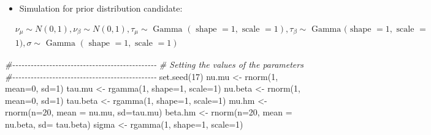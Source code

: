 \documentclass[
]{article}
\newenvironment{Shaded}{\begin{snugshade}}{\end{snugshade}}
\newcommand{\AttributeTok}[1]{\textcolor[rgb]{0.77,0.63,0.00}{#1}}
\newcommand{\CommentTok}[1]{\textcolor[rgb]{0.56,0.35,0.01}{\textit{#1}}}
\newcommand{\DecValTok}[1]{\textcolor[rgb]{0.00,0.00,0.81}{#1}}
\newcommand{\FunctionTok}[1]{\textcolor[rgb]{0.00,0.00,0.00}{#1}}
\newcommand{\NormalTok}[1]{#1}
\newcommand{\OtherTok}[1]{\textcolor[rgb]{0.56,0.35,0.01}{#1}}
\providecommand{\tightlist}{%
  \setlength{\itemsep}{0pt}\setlength{\parskip}{0pt}}
\begin{document}
\begin{itemize}
\tightlist
\item
  Simulation for prior distribution candidate:
\end{itemize}

\[
\begin{aligned}
& \nu_\mu \sim N(0,1), \nu_\beta \sim N(0,1), \tau_\mu \sim \text { Gamma }(\text { shape }=1, \text { scale }=1), \tau_\beta \sim \text { Gamma }(\text { shape }=1, \text { scale }= \\
& 1), \sigma \sim \text { Gamma }(\text { shape }=1, \text { scale }=1)
\end{aligned}
\]

\begin{Shaded}
\begin{Highlighting}[]
\CommentTok{\#{-}{-}{-}{-}{-}{-}{-}{-}{-}{-}{-}{-}{-}{-}{-}{-}{-}{-}{-}{-}{-}{-}{-}{-}{-}{-}{-}{-}{-}{-}{-}{-}{-}{-}{-}{-}{-}{-}{-}{-}{-}{-}{-}{-}{-}{-}{-}}
\CommentTok{\# Setting the values of the parameters}
\CommentTok{\#{-}{-}{-}{-}{-}{-}{-}{-}{-}{-}{-}{-}{-}{-}{-}{-}{-}{-}{-}{-}{-}{-}{-}{-}{-}{-}{-}{-}{-}{-}{-}{-}{-}{-}{-}{-}{-}{-}{-}{-}{-}{-}{-}{-}{-}{-}{-}}
\FunctionTok{set.seed}\NormalTok{(}\DecValTok{17}\NormalTok{)}
\NormalTok{nu.mu }\OtherTok{\textless{}{-}} \FunctionTok{rnorm}\NormalTok{(}\DecValTok{1}\NormalTok{, }\AttributeTok{mean=}\DecValTok{0}\NormalTok{, }\AttributeTok{sd=}\DecValTok{1}\NormalTok{)}
\NormalTok{tau.mu }\OtherTok{\textless{}{-}} \FunctionTok{rgamma}\NormalTok{(}\DecValTok{1}\NormalTok{, }\AttributeTok{shape=}\DecValTok{1}\NormalTok{, }\AttributeTok{scale=}\DecValTok{1}\NormalTok{)}
\NormalTok{nu.beta }\OtherTok{\textless{}{-}} \FunctionTok{rnorm}\NormalTok{(}\DecValTok{1}\NormalTok{, }\AttributeTok{mean=}\DecValTok{0}\NormalTok{, }\AttributeTok{sd=}\DecValTok{1}\NormalTok{)}
\NormalTok{tau.beta }\OtherTok{\textless{}{-}} \FunctionTok{rgamma}\NormalTok{(}\DecValTok{1}\NormalTok{, }\AttributeTok{shape=}\DecValTok{1}\NormalTok{, }\AttributeTok{scale=}\DecValTok{1}\NormalTok{)}
\NormalTok{mu.hm }\OtherTok{\textless{}{-}} \FunctionTok{rnorm}\NormalTok{(}\AttributeTok{n=}\DecValTok{20}\NormalTok{, }\AttributeTok{mean =}\NormalTok{ nu.mu, }\AttributeTok{sd=}\NormalTok{tau.mu)}
\NormalTok{beta.hm }\OtherTok{\textless{}{-}} \FunctionTok{rnorm}\NormalTok{(}\AttributeTok{n=}\DecValTok{20}\NormalTok{, }\AttributeTok{mean =}\NormalTok{ nu.beta, }\AttributeTok{sd=}\NormalTok{ tau.beta)}
\NormalTok{sigma }\OtherTok{\textless{}{-}} \FunctionTok{rgamma}\NormalTok{(}\DecValTok{1}\NormalTok{, }\AttributeTok{shape=}\DecValTok{1}\NormalTok{, }\AttributeTok{scale=}\DecValTok{1}\NormalTok{)}

\end{Highlighting}
\end{Shaded}
\end{document}
